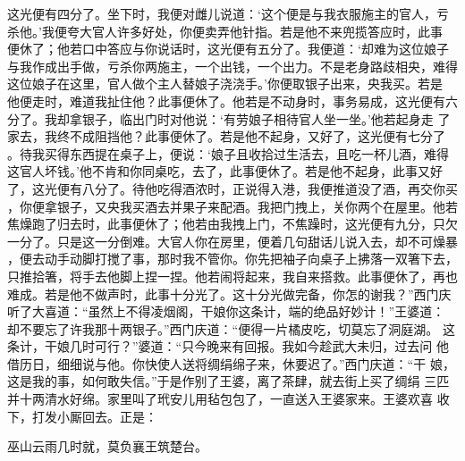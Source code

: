 这光便有四分了。坐下时，我便对雌儿说道：‘这个便是与我衣服施主的官人，亏
杀他。’我便夸大官人许多好处，你便卖弄他针指。若是他不来兜揽答应时，此事
便休了；他若口中答应与你说话时，这光便有五分了。我便道：‘却难为这位娘子
与我作成出手做，亏杀你两施主，一个出钱，一个出力。不是老身路歧相央，难得
这位娘子在这里，官人做个主人替娘子浇浇手。’你便取银子出来，央我买。若是
他便走时，难道我扯住他？此事便休了。他若是不动身时，事务易成，这光便有六
分了。我却拿银子，临出门时对他说：‘有劳娘子相待官人坐一坐。’他若起身走
了家去，我终不成阻挡他？此事便休了。若是他不起身，又好了，这光便有七分了
。待我买得东西提在桌子上，便说：‘娘子且收拾过生活去，且吃一杯儿酒，难得
这官人坏钱。’他不肯和你同桌吃，去了，此事便休了。若是他不起身，此事又好
了，这光便有八分了。待他吃得酒浓时，正说得入港，我便推道没了酒，再交你买
，你便拿银子，又央我买酒去并果子来配酒。我把门拽上，关你两个在屋里。他若
焦燥跑了归去时，此事便休了；他若由我拽上门，不焦躁时，这光便有九分，只欠
一分了。只是这一分倒难。大官人你在房里，便着几句甜话儿说入去，却不可燥暴
，便去动手动脚打搅了事，那时我不管你。你先把袖子向桌子上拂落一双箸下去，
只推拾箸，将手去他脚上捏一捏。他若闹将起来，我自来搭救。此事便休了，再也
难成。若是他不做声时，此事十分光了。这十分光做完备，你怎的谢我？”西门庆
听了大喜道：“虽然上不得凌烟阁，干娘你这条计，端的绝品好妙计！”王婆道：
却不要忘了许我那十两银子。”西门庆道：“便得一片橘皮吃，切莫忘了洞庭湖。
这条计，干娘几时可行？”婆道：“只今晚来有回报。我如今趁武大未归，过去问
他借历日，细细说与他。你快使人送将绸绢绵子来，休要迟了。”西门庆道：“干
娘，这是我的事，如何敢失信。”于是作别了王婆，离了茶肆，就去街上买了绸绢
三匹并十两清水好绵。家里叫了玳安儿用毡包包了，一直送入王婆家来。王婆欢喜
收下，打发小厮回去。正是：

巫山云雨几时就，莫负襄王筑楚台。

